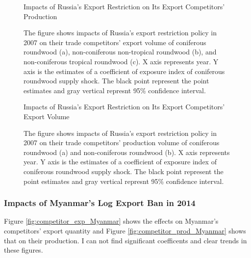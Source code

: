 \documentclass[a4paper,12pt]{article}
\begin{document}
\begin{figure}[htbp] 
    \centering
    \caption{Impacts of Russia's Export Restriction on Its Export Competitors' Production}
    \caption*{\small{The figure shows impacts of Russia's export restriction policy in 2007 on their trade competitors' export volume of coniferous roundwood (a), non-coniferous non-tropical roundwood (b), and non-coniferous tropical roundwood (c). X axis represents year. Y axis is the estimates of a coefficient of exposure index of coniferous roundwood supply shock. The black point represent the point estimates and gray vertical represnt 95\% confidence interval.}}
    \label{fig:competitor_exp_Russia}
\end{figure}

\begin{figure}[htbp] 
    \centering
    \caption{Impacts of Russia's Export Restriction on Its Export Competitors' Export Volume}
    \caption*{\small{The figure shows impacts of Russia's export restriction policy in 2007 on their trade competitors' production volume of coniferous roundwood (a) and non-coniferous roundwood (b). X axis represents year. Y axis is the estimates of a coefficient of exposure index of coniferous roundwood supply shock. The black point represent the point estimates and gray vertical represnt 95\% confidence interval.}}
    \label{fig:competitor_prod_Russia}
\end{figure}

\subsubsection{Impacts of Myanmar's Log Export Ban in 2014}
Figure \ref{fig:competitor_exp_Myanmar} shows the effects on Myanmar's competitors' export quantity and Figure \ref{fig:competitor_prod_Myanmar} shows that on their production. I can not find significant coefficents and clear trends in these figures.
\end{document}

